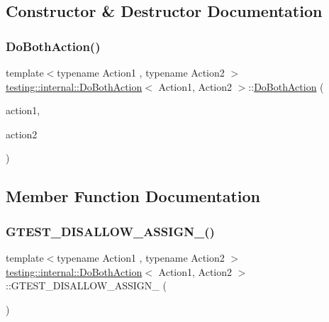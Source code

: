 \subsection{Constructor \& Destructor Documentation}
\mbox{\label{classtesting_1_1internal_1_1_do_both_action_a55727c4dbdc1816ba6f1fe124e96088b}} 
\subsubsection{\texorpdfstring{DoBothAction()}{DoBothAction()}}
{\footnotesize\ttfamily template$<$typename Action1 , typename Action2 $>$ \\
\mbox{\hyperlink{classtesting_1_1internal_1_1_do_both_action}{testing\+::internal\+::\+Do\+Both\+Action}}$<$ Action1, Action2 $>$\+::\mbox{\hyperlink{classtesting_1_1internal_1_1_do_both_action}{Do\+Both\+Action}} (\begin{DoxyParamCaption}\item[{Action1}]{action1,  }\item[{Action2}]{action2 }\end{DoxyParamCaption})\hspace{0.3cm}{\ttfamily [inline]}}



\subsection{Member Function Documentation}
\mbox{\label{classtesting_1_1internal_1_1_do_both_action_a3428a1598ba58759f1a3f7d4443d6490}} 
\subsubsection{\texorpdfstring{GTEST\_DISALLOW\_ASSIGN\_()}{GTEST\_DISALLOW\_ASSIGN\_()}}
{\footnotesize\ttfamily template$<$typename Action1 , typename Action2 $>$ \\
\mbox{\hyperlink{classtesting_1_1internal_1_1_do_both_action}{testing\+::internal\+::\+Do\+Both\+Action}}$<$ Action1, Action2 $>$\+::G\+T\+E\+S\+T\+\_\+\+D\+I\+S\+A\+L\+L\+O\+W\+\_\+\+A\+S\+S\+I\+G\+N\+\_\+ (\begin{DoxyParamCaption}\item[{\mbox{\hyperlink{classtesting_1_1internal_1_1_do_both_action}{Do\+Both\+Action}}$<$ Action1, Action2 $>$}]{ }\end{DoxyParamCaption})\hspace{0.3cm}{\ttfamily [private]}}

